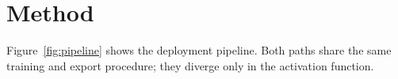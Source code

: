 \documentclass[10pt,twocolumn]{article}
\begin{document}
\begin{table}[t]
\centering
\caption{Operator mapping to NPU execution epochs. ReLU INT8 achieves
near-100\% NPU utilization; QCFS INT8 forces CPU fallback at every
\texttt{Floor} invocation.}
\label{tab:opmap}
\small
{}
\end{table}

\section{Method}
\label{sec:method}

Figure~\ref{fig:pipeline} shows the deployment pipeline.
Both paths share the same training and export procedure; they diverge
only in the activation function.
\end{document}

